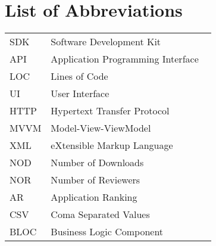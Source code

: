 \section*{ \Huge List of Abbreviations}
\vskip 1.5cm
\begin{tabular}{@{}p{0.2\linewidth} p{0.8\linewidth}}
    SDK & Software Development Kit \\
    API & Application Programming Interface \\
    LOC & Lines of Code \\
    UI & User Interface  \\
    HTTP & Hypertext Transfer Protocol  \\
    MVVM & Model-View-ViewModel  \\
    XML & eXtensible Markup Language \\
    NOD & Number of Downloads \\
    NOR & Number of Reviewers \\
    AR & Application Ranking \\
    CSV & Coma Separated Values \\
    BLOC & Business Logic Component
\end{tabular}